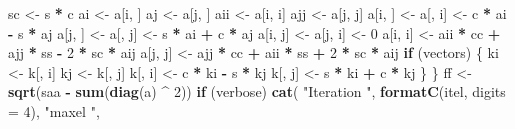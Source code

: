 \documentclass[12pt,]{article}
\newenvironment{Shaded}{\begin{snugshade}}{\end{snugshade}}
\newcommand{\KeywordTok}[1]{\textcolor[rgb]{0.13,0.29,0.53}{\textbf{#1}}}
\newcommand{\DataTypeTok}[1]{\textcolor[rgb]{0.13,0.29,0.53}{#1}}
\newcommand{\DecValTok}[1]{\textcolor[rgb]{0.00,0.00,0.81}{#1}}
\newcommand{\StringTok}[1]{\textcolor[rgb]{0.31,0.60,0.02}{#1}}
\newcommand{\ControlFlowTok}[1]{\textcolor[rgb]{0.13,0.29,0.53}{\textbf{#1}}}
\newcommand{\OperatorTok}[1]{\textcolor[rgb]{0.81,0.36,0.00}{\textbf{#1}}}
\newcommand{\NormalTok}[1]{#1}
\begin{document}
\begin{Shaded}
\begin{Highlighting}[]
\NormalTok{          sc <-}\StringTok{ }\NormalTok{s }\OperatorTok{*}\StringTok{ }\NormalTok{c}
\NormalTok{          ai <-}\StringTok{ }\NormalTok{a[i, ]}
\NormalTok{          aj <-}\StringTok{ }\NormalTok{a[j, ]}
\NormalTok{          aii <-}\StringTok{ }\NormalTok{a[i, i]}
\NormalTok{          ajj <-}\StringTok{ }\NormalTok{a[j, j]}
\NormalTok{          a[i, ] <-}\StringTok{ }\NormalTok{a[, i] <-}\StringTok{ }\NormalTok{c }\OperatorTok{*}\StringTok{ }\NormalTok{ai }\OperatorTok{-}\StringTok{ }\NormalTok{s }\OperatorTok{*}\StringTok{ }\NormalTok{aj}
\NormalTok{          a[j, ] <-}\StringTok{ }\NormalTok{a[, j] <-}\StringTok{ }\NormalTok{s }\OperatorTok{*}\StringTok{ }\NormalTok{ai }\OperatorTok{+}\StringTok{ }\NormalTok{c }\OperatorTok{*}\StringTok{ }\NormalTok{aj}
\NormalTok{          a[i, j] <-}\StringTok{ }\NormalTok{a[j, i] <-}\StringTok{ }\DecValTok{0}
\NormalTok{          a[i, i] <-}\StringTok{ }\NormalTok{aii }\OperatorTok{*}\StringTok{ }\NormalTok{cc }\OperatorTok{+}\StringTok{ }\NormalTok{ajj }\OperatorTok{*}\StringTok{ }\NormalTok{ss }\OperatorTok{-}\StringTok{ }\DecValTok{2} \OperatorTok{*}\StringTok{ }\NormalTok{sc }\OperatorTok{*}\StringTok{ }\NormalTok{aij}
\NormalTok{          a[j, j] <-}\StringTok{ }\NormalTok{ajj }\OperatorTok{*}\StringTok{ }\NormalTok{cc }\OperatorTok{+}\StringTok{ }\NormalTok{aii }\OperatorTok{*}\StringTok{ }\NormalTok{ss }\OperatorTok{+}\StringTok{ }\DecValTok{2} \OperatorTok{*}\StringTok{ }\NormalTok{sc }\OperatorTok{*}\StringTok{ }\NormalTok{aij}
          \ControlFlowTok{if}\NormalTok{ (vectors) \{}
\NormalTok{            ki <-}\StringTok{ }\NormalTok{k[, i]}
\NormalTok{            kj <-}\StringTok{ }\NormalTok{k[, j]}
\NormalTok{            k[, i] <-}\StringTok{ }\NormalTok{c }\OperatorTok{*}\StringTok{ }\NormalTok{ki }\OperatorTok{-}\StringTok{ }\NormalTok{s }\OperatorTok{*}\StringTok{ }\NormalTok{kj}
\NormalTok{            k[, j] <-}\StringTok{ }\NormalTok{s }\OperatorTok{*}\StringTok{ }\NormalTok{ki }\OperatorTok{+}\StringTok{ }\NormalTok{c }\OperatorTok{*}\StringTok{ }\NormalTok{kj}
\NormalTok{          \}}
\NormalTok{        \}}
\NormalTok{      ff <-}\StringTok{ }\KeywordTok{sqrt}\NormalTok{(saa }\OperatorTok{-}\StringTok{ }\KeywordTok{sum}\NormalTok{(}\KeywordTok{diag}\NormalTok{(a) }\OperatorTok{^}\StringTok{ }\DecValTok{2}\NormalTok{))}
      \ControlFlowTok{if}\NormalTok{ (verbose)}
        \KeywordTok{cat}\NormalTok{(}
          \StringTok{"Iteration "}\NormalTok{,}
          \KeywordTok{formatC}\NormalTok{(itel, }\DataTypeTok{digits =} \DecValTok{4}\NormalTok{),}
          \StringTok{"maxel "}\NormalTok{,}

\end{Highlighting}
\end{Shaded}
\end{document}
